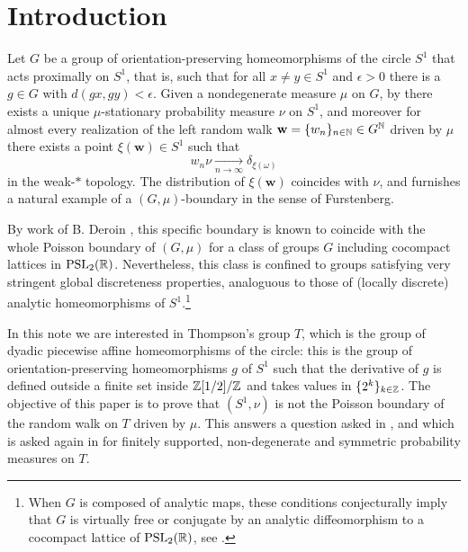 \section{Introduction}
Let $G$ be a group of orientation-preserving homeomorphisms of the circle $S^1$ that acts proximally on $S^1$, that is, such that for all $x \neq y \in S^1$ and $\epsilon > 0$ there is a $g \in G$ with $d(gx,gy) < \epsilon$. Given a nondegenerate measure $\mu$ on $G$, by \cite{DeroinKleptsynNavas2007} there exists a unique $\mu$-stationary probability measure $\nu$ on $S^1$, and moreover for almost every realization of the left random walk $\mathbf{w} = \{w_n\}_{n \in {\mathbb N}} \in G^{{\mathbb N}}$ driven by $\mu$ there exists a point $\xi(\mathbf{w}) \in S^1$ such that
\[
w_n \nu \xrightarrow[n \to \infty]{}\delta_{\xi(\omega)}
\]in the weak-$\ast$ topology.
The distribution of $\xi(\mathbf{w})$ coincides with $\nu$, %
and furnishes a natural example of a $(G, \mu)$-boundary in the sense of Furstenberg.

By work of B. Deroin \cite{Deroin2013}, this specific boundary is known to coincide with the whole Poisson boundary of $(G, \mu)$ for a class of groups $G$ including cocompact lattices in $\mathrm{PSL}_2({\mathbb R})$. Nevertheless, this class is confined to groups satisfying very stringent global discreteness properties, analoguous to those of (locally discrete) analytic homeomorphisms of $S^1$.\footnote{When $G$ is composed of analytic maps, these conditions conjecturally imply that $G$ is virtually free or conjugate by an analytic diffeomorphism to a cocompact lattice of $\mathrm{PSL}_2({\mathbb R})$, see \cite{Deroin2020}.}

In this note we are interested in Thompson's group $T$, which is the group of dyadic piecewise affine homeomorphisms of the circle: this is the group of orientation-preserving homeomorphisms $g$ of $S^1$ such that the derivative of $g$ is defined outside a finite set inside ${\mathbb Z}[1/2]/{\mathbb Z}$ and takes values in $\{2^k\}_{k \in {\mathbb Z}}$. 
The objective of this paper is to prove that $(S^1,\nu)$ is not the Poisson boundary of the random walk on $T$ driven by $\mu$. This answers a question asked in \cite[Section 6]{Deroin2013}, and which is asked again in \cite[Question 19]{Navas2018} for finitely supported, non-degenerate and symmetric probability measures on $T$.

